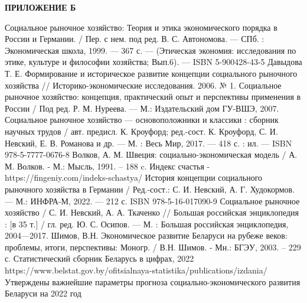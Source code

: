 \documentclass[14pt,a4paper]{article}
\begin{document}
    \newpage
    \begin{center}
        \textbf{\LARGE{ПРИЛОЖЕНИЕ Б}}
    \end{center}

    \newpage
    \setcounter{page}{34}
    \begin{center}
        \renewcommand\refname{СПИСОК ИСПОЛЬЗОВАННЫХ ИСТОЧНИКОВ}
        \begin{thebibliography}{10}
             Социальное рыночное хозяйство: Теория и этика экономического порядка в России и Германии. / Пер. с нем. под ред. В. С. Автономова. — СПб. : Экономическая школа, 1999. — 367 с. — (Этическая экономия: исследования по этике, культуре и философии хозяйства; Вып.6). — ISBN 5-900428-43-5
             Давыдова Т. Е. Формирование и историческое развитие концепции социального рыночного хозяйства // Историко-экономические исследования. 2006. № 1.
             Социальное рыночное хозяйство: концепция, практический опыт и перспективы применения в России / Под ред. Р. М. Нуреева. — М.: Издательский дом ГУ-ВШЭ, 2007.
             Социальное рыночное хозяйство — основоположники и классики : сборник научных трудов / авт. предисл. К. Кроуфорд; ред.-сост. К. Кроуфорд, С. И. Невский, Е. В. Романова и др. — М. : Весь Мир, 2017. — 418 с. : ил. — ISBN 978-5-7777-0676-8
             Волков, А. М. Швеция: социально-экономическая модель / А. М. Волков. - М.: Мысль, 1991. – 188 c.
             Индекс счастья - https://fingeniy.com/indeks-schastya/
             История концепции социального рыночного хозяйства в Германии / Ред.-сост.: С. И. Невский, А. Г. Худокормов. — М.: ИНФРА-М, 2022. — 212 с. ISBN 978-5-16-017090-9
             Социальное рыночное хозяйство / С. И. Невский, А. А. Ткаченко // Большая российская энциклопедия : [в 35 т.] / гл. ред. Ю. С. Осипов. — М. : Большая российская энциклопедия, 2004—2017.
             Шимов, В.Н. Экономическое развитие Беларуси на рубеже веков: проблемы, итоги, перспективы: Моногр. / В.Н. Шимов. - Мн.: БГЭУ, 2003. – 229 с.
             Статистический сборник Беларусь в цифрах, 2022
            \\
            https://www.belstat.gov.by/ofitsialnaya-statistika/publications/izdania/
            \\
             Утверждены важнейшие параметры прогноза социально-экономического развития Беларуси на 2022 год

\end{thebibliography}
\end{center}
\end{document}
